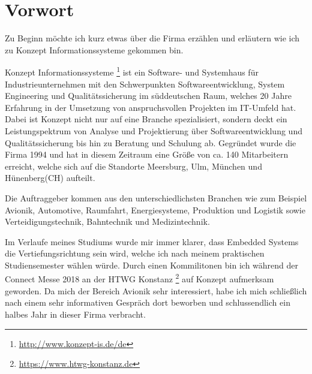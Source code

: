 \chapter{Vorwort}
\label{ch:0}

Zu Beginn möchte ich kurz etwas über die Firma erzählen und erläutern wie ich 
zu Konzept Informationssysteme gekommen bin.

Konzept Informationssysteme \footnote{\url{http://www.konzept-is.de/de}} ist ein Software- und Systemhaus für Industrieunternehmen mit den Schwerpunkten Softwareentwicklung, System Engineering und Qualitätssicherung im süddeutschen Raum, welches 20 Jahre Erfahrung in der Umsetzung von anspruchsvollen Projekten im IT-Umfeld hat. Dabei ist Konzept nicht nur auf eine Branche spezialisiert, sondern deckt ein Leistungspektrum von Analyse und Projektierung über Softwareentwicklung und Qualitätssicherung bis hin zu Beratung und Schulung ab.
Gegründet wurde die Firma 1994 und hat in diesem Zeitraum eine Größe von ca. 140 Mitarbeitern erreicht, welche sich auf die Standorte Meersburg, Ulm, München und Hünenberg(CH) aufteilt. 

Die Auftraggeber kommen aus den unterschiedlichsten Branchen wie zum Beispiel Avionik, Automotive, Raumfahrt, Energiesysteme, Produktion und Logistik sowie Verteidigungstechnik, Bahntechnik und Medizintechnik.

Im Verlaufe meines Studiums wurde mir immer klarer, dass Embedded Systems die Vertiefungsrichtung sein wird, welche ich nach meinem praktischen Studiensemester wählen würde. Durch einen Kommilitonen bin ich während der Connect Messe 2018 an der HTWG Konstanz \footnote{\url{https://www.htwg-konstanz.de}} auf Konzept aufmerksam geworden. Da mich der Bereich Avionik sehr interessiert, habe ich mich schließlich nach einem sehr informativen Gespräch dort beworben und schlussendlich ein halbes Jahr in dieser Firma verbracht. 
